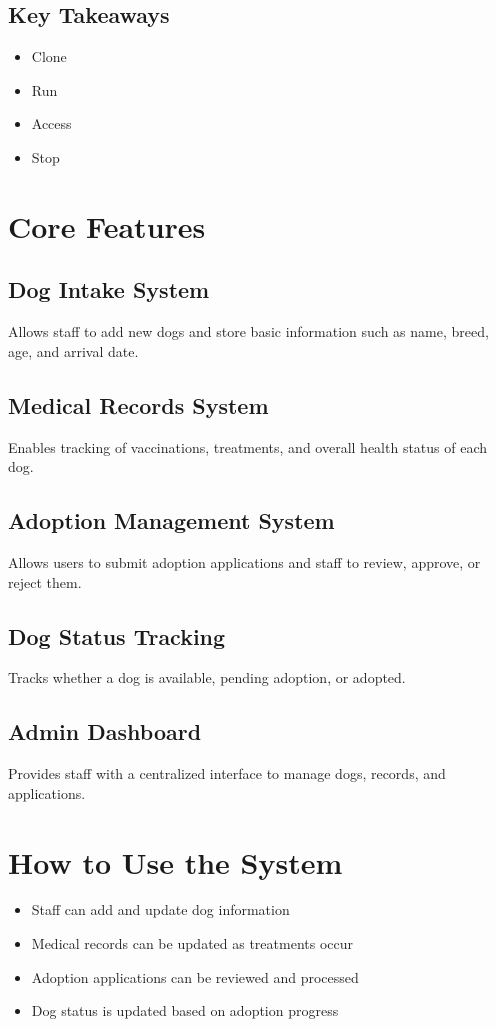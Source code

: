 \documentclass{article}
\begin{document}
\subsection{Key Takeaways}
\begin{itemize}
    \item Clone
    \item Run
    \item Access
    \item Stop
\end{itemize}

\section{Core Features}

\subsection{Dog Intake System}
Allows staff to add new dogs and store basic information such as name, breed, age, and arrival date.

\subsection{Medical Records System}
Enables tracking of vaccinations, treatments, and overall health status of each dog.

\subsection{Adoption Management System}
Allows users to submit adoption applications and staff to review, approve, or reject them.

\subsection{Dog Status Tracking}
Tracks whether a dog is available, pending adoption, or adopted.

\subsection{Admin Dashboard}
Provides staff with a centralized interface to manage dogs, records, and applications.

\section{How to Use the System}
\begin{itemize}
    \item Staff can add and update dog information
    \item Medical records can be updated as treatments occur
    \item Adoption applications can be reviewed and processed
    \item Dog status is updated based on adoption progress
\end{itemize}
\end{document}
